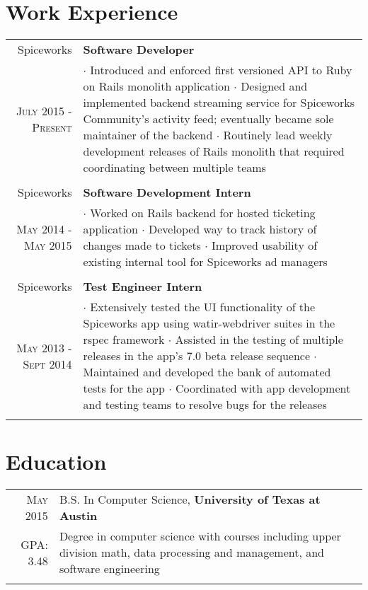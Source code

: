\documentclass[a4paper,10pt]{article}
\begin{document}
\section{Work Experience}
\begin{tabular}{r|p{11cm}}
  Spiceworks & \textbf{Software Developer} \\
  \textsc{July 2015 - Present} &
    \footnotesize{
      $\cdot$ Introduced and enforced first versioned API to Ruby on Rails monolith
      application
      $\cdot$ Designed and implemented backend streaming service for Spiceworks Community's
      activity feed; eventually became sole maintainer of the backend
      $\cdot$ Routinely lead weekly development releases of Rails monolith that required
      coordinating between multiple teams

    }
    \\\multicolumn{2}{c}{} \\

  Spiceworks & \textbf{Software Development Intern} \\
  \textsc{May 2014 - May 2015} &
    \footnotesize{
      $\cdot$ Worked on Rails backend for hosted ticketing application
      $\cdot$ Developed way to track history of changes made to tickets
      $\cdot$ Improved usability of existing internal tool for Spiceworks ad managers

    }
    \\\multicolumn{2}{c}{} \\

  Spiceworks & \textbf{Test Engineer Intern} \\
  \textsc{May 2013 - Sept 2014} &
    \footnotesize{
      $\cdot$ Extensively tested the UI functionality of the Spiceworks app using watir-webdriver suites
      in the rspec framework
      $\cdot$ Assisted in the testing of multiple releases in the app’s 7.0 beta release sequence
      $\cdot$ Maintained and developed the bank of automated tests for the app
      $\cdot$ Coordinated with app development and testing teams to resolve bugs for the releases

    }
    \\\multicolumn{2}{c}{} \\

\end{tabular}

\section{Education}
\begin{tabular}{rp{11cm}}
  \textsc{May} 2015 & B.S. In Computer Science, \textbf{University of Texas at Austin}\\
  \textsc{GPA}: 3.48 &
  \footnotesize{
    Degree in computer science with courses including upper division math,
    data processing and management, and software engineering
  }
  \\\multicolumn{2}{c}{} \\

\end{tabular}


\end{document}
